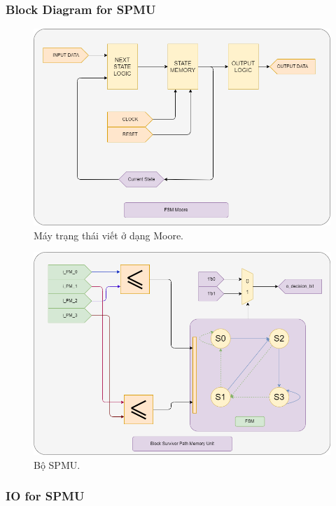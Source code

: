 \subsubsection{Block Diagram for SPMU}

\begin{figure}[H]
	\centering
	\includegraphics[width=.8\linewidth]{sections/pic/mophongbangSystemVerilog/FSM.png}
	\caption{Máy trạng thái viết ở dạng Moore.}
	\label{f_moore}
\end{figure}

\begin{figure}[H]
	\centering
	\includegraphics[width=.8\linewidth]{sections/pic/mophongbangSystemVerilog/SPMU.png}
	\caption{Bộ SPMU.}
\end{figure}

\subsubsection{IO for SPMU}

